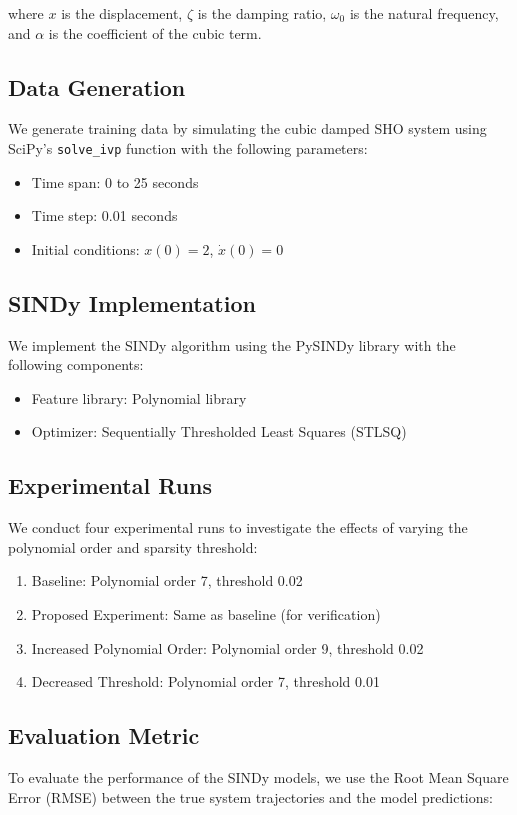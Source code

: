 \documentclass{article} %
\begin{document}
where $x$ is the displacement, $\zeta$ is the damping ratio, $\omega_0$ is the natural frequency, and $\alpha$ is the coefficient of the cubic term.

\subsection{Data Generation}
We generate training data by simulating the cubic damped SHO system using SciPy's \texttt{solve\_ivp} function with the following parameters:

\begin{itemize}
    \item Time span: 0 to 25 seconds
    \item Time step: 0.01 seconds
    \item Initial conditions: $x(0) = 2$, $\dot{x}(0) = 0$
\end{itemize}

\subsection{SINDy Implementation}
We implement the SINDy algorithm using the PySINDy library with the following components:

\begin{itemize}
    \item Feature library: Polynomial library
    \item Optimizer: Sequentially Thresholded Least Squares (STLSQ)
\end{itemize}

\subsection{Experimental Runs}
We conduct four experimental runs to investigate the effects of varying the polynomial order and sparsity threshold:

\begin{enumerate}
    \item Baseline: Polynomial order 7, threshold 0.02
    \item Proposed Experiment: Same as baseline (for verification)
    \item Increased Polynomial Order: Polynomial order 9, threshold 0.02
    \item Decreased Threshold: Polynomial order 7, threshold 0.01
\end{enumerate}

\subsection{Evaluation Metric}
To evaluate the performance of the SINDy models, we use the Root Mean Square Error (RMSE) between the true system trajectories and the model predictions:
\end{document}
